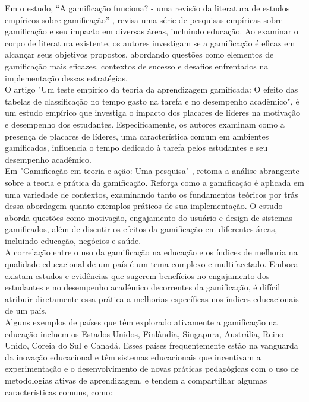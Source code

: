 Em o estudo, “A gamificação funciona? - uma revisão da literatura de estudos empíricos sobre gamificação” \citep{hamari2014does}, revisa uma série de pesquisas empíricas sobre gamificação e seu impacto em diversas áreas, incluindo educação. Ao examinar o corpo de literatura existente, os autores investigam se a gamificação é eficaz em alcançar seus objetivos propostos, abordando questões como elementos de gamificação mais eficazes, contextos de sucesso e desafios enfrentados na implementação dessas estratégias.
\\

O artigo "Um teste empírico da teoria da aprendizagem gamificada: O efeito das tabelas de classificação no tempo gasto na tarefa e no desempenho acadêmico",  \citep{landers2014empirical} é um estudo empírico que investiga o impacto dos placares de líderes na motivação e desempenho dos estudantes. Especificamente, os autores examinam como a presença de placares de líderes, uma característica comum em ambientes gamificados, influencia o tempo dedicado à tarefa pelos estudantes e seu desempenho acadêmico.
\\

Em "Gamificação em teoria e ação: Uma pesquisa" \citep{seaborn2015gamification},  retoma a análise abrangente sobre a teoria e prática da gamificação. Reforça como a gamificação é aplicada em uma variedade de contextos, examinando tanto os fundamentos teóricos por trás dessa abordagem quanto exemplos práticos de sua implementação. O estudo aborda questões como motivação, engajamento do usuário e design de sistemas gamificados, além de discutir os efeitos da gamificação em diferentes áreas, incluindo educação, negócios e saúde.
\\

A correlação entre o uso da gamificação na educação e os índices de melhoria na qualidade educacional de um país é um tema complexo e multifacetado. Embora existam estudos e evidências que sugerem benefícios no engajamento dos estudantes e no desempenho acadêmico decorrentes da gamificação, é difícil atribuir diretamente essa prática a melhorias específicas nos índices educacionais de um país.  
\\

Alguns exemplos de países que têm explorado ativamente a gamificação na educação incluem os Estados Unidos, Finlândia, Singapura, Austrália, Reino Unido, Coreia do Sul e Canadá. Esses países frequentemente estão na vanguarda da inovação educacional e têm sistemas educacionais que incentivam a experimentação e o desenvolvimento de novas práticas pedagógicas com o uso de metodologias ativas de aprendizagem, e tendem a compartilhar algumas características comuns, como: 
\\

